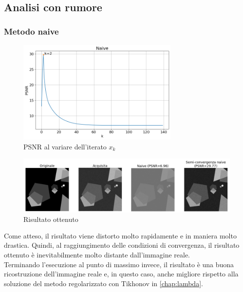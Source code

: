 \documentclass[11pt]{article}
\begin{document}
\subsection{Analisi con rumore}
\subsubsection{Metodo naive}
\begin{figure}[H]
    \centering
    \includegraphics[width=8cm]{semiconvergenza/1/psnr_naive.png}
    \caption{PSNR al variare dell'iterato $x_k$}
    \label{fig:semiconv_psnr_naive1}
\end{figure}
\begin{figure}[H]
    \centering
    \includegraphics[width=15cm]{semiconvergenza/1/deblur_naive.png}
    \caption{Risultato ottenuto}
    \label{fig:semiconv_deblur_naive1}
\end{figure}
Come atteso, il risultato viene distorto molto rapidamente e in maniera molto drastica. Quindi, al raggiungimento delle condizioni di convergenza, il risultato ottenuto è inevitabilmente molto distante dall'immagine reale.\\
Terminando l'esecuzione al punto di massimo invece, il risultato è una buona ricostruzione dell'immagine reale e, in questo caso, anche migliore rispetto alla soluzione del metodo regolarizzato con Tikhonov in \autoref{chap:lambda}.
\end{document}

